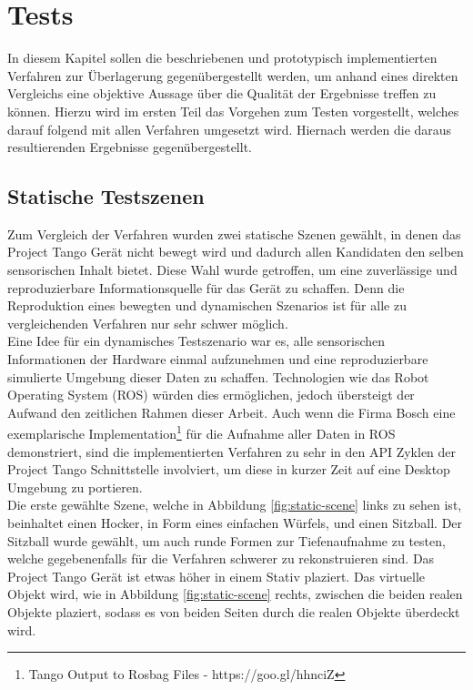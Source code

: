 \chapter{Tests} \label{sec:evaluation}

In diesem Kapitel sollen die beschriebenen und prototypisch implementierten Verfahren zur Überlagerung gegenübergestellt werden, um anhand eines direkten Vergleichs eine objektive Aussage über die Qualität der Ergebnisse treffen zu können. Hierzu wird im ersten Teil das Vorgehen zum Testen vorgestellt, welches darauf folgend mit allen Verfahren umgesetzt wird. Hiernach werden die daraus resultierenden Ergebnisse gegenübergestellt.

\section{Statische Testszenen}

Zum Vergleich der Verfahren wurden zwei statische Szenen gewählt, in denen das Project Tango Gerät nicht bewegt wird und dadurch allen Kandidaten den selben sensorischen Inhalt bietet. Diese Wahl wurde getroffen, um eine zuverlässige und reproduzierbare Informationsquelle für das Gerät zu schaffen. Denn die Reproduktion eines bewegten und dynamischen Szenarios ist für alle zu vergleichenden Verfahren nur sehr schwer möglich. \\

Eine Idee für ein dynamisches Testszenario war es, alle sensorischen Informationen der Hardware einmal aufzunehmen und eine reproduzierbare simulierte Umgebung dieser Daten zu schaffen. Technologien wie das Robot Operating System (ROS) würden dies ermöglichen, jedoch übersteigt der Aufwand den zeitlichen Rahmen dieser Arbeit. Auch wenn die Firma Bosch eine exemplarische Implementation\footnote{Tango Output to Rosbag Files - https://goo.gl/hhnciZ} für die Aufnahme aller Daten in ROS demonstriert, sind die implementierten Verfahren zu sehr in den API Zyklen der Project Tango Schnittstelle involviert, um diese in kurzer Zeit auf eine Desktop Umgebung zu portieren.\\

Die erste gewählte Szene, welche in Abbildung \ref{fig:static-scene} links zu sehen ist, beinhaltet einen Hocker, in Form eines einfachen  Würfels, und einen Sitzball. Der Sitzball wurde gewählt, um auch runde Formen zur Tiefenaufnahme zu testen, welche gegebenenfalls für die Verfahren schwerer zu rekonstruieren sind. Das Project Tango Gerät ist etwas höher in einem Stativ plaziert. Das virtuelle Objekt wird, wie in Abbildung \ref{fig:static-scene} rechts, zwischen die beiden realen Objekte plaziert, sodass es von beiden Seiten durch die realen Objekte überdeckt wird. \\

